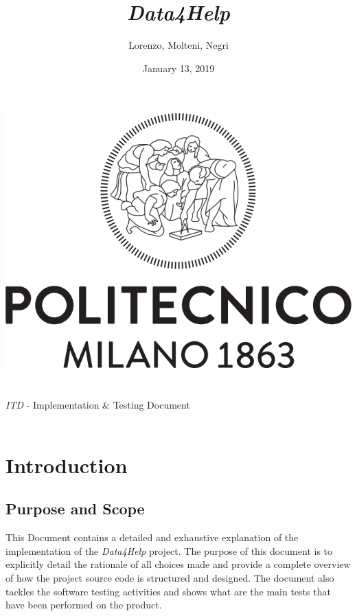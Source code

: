 \documentclass[titlepage]{article}
\title{{\Huge {\it {\it Data4Help}}}}
\author{Lorenzo, Molteni, Negri}
\date{January 13, 2019}
\begin{document}
	
	\makeatletter
	\begin{titlepage}
		\begin{center}
			\includegraphics[width=\linewidth]{logo.png}\\[20ex]
			{\huge  \@title }\\[2ex] 
			{\LARGE  \@author}\\[3ex] 
			{\LARGE {\it ITD} - Implementation \& Testing Document}\\[3ex]
			{\large \@date}\\[5ex]
		\end{center}
	\end{titlepage}
	\makeatother
	\thispagestyle{empty}
	\newpage
	
	\thispagestyle{empty}
	\newpage
	
	
	
	\pagebreak
	\tableofcontents{}
	\pagebreak
	
	
	\section{Introduction}
	\subsection{Purpose and Scope}
	This Document contains a detailed and exhaustive explanation of the implementation of the {\it Data4Help} project. The purpose of this document is to explicitly detail the rationale of all choices made and provide a complete overview of how the project source code is structured and designed.
	The document also tackles the software testing activities and shows what are the main tests that have been performed on the product.
	
\end{document}

